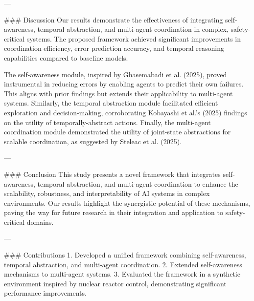 ---

### Discussion  
Our results demonstrate the effectiveness of integrating self-awareness, temporal abstraction, and multi-agent coordination in complex, safety-critical systems. The proposed framework achieved significant improvements in coordination efficiency, error prediction accuracy, and temporal reasoning capabilities compared to baseline models.  

The self-awareness module, inspired by Ghasemabadi et al. (2025), proved instrumental in reducing errors by enabling agents to predict their own failures. This aligns with prior findings but extends their applicability to multi-agent systems. Similarly, the temporal abstraction module facilitated efficient exploration and decision-making, corroborating Kobayashi et al.'s (2025) findings on the utility of temporally-abstract actions. Finally, the multi-agent coordination module demonstrated the utility of joint-state abstractions for scalable coordination, as suggested by Steleac et al. (2025).  

---

### Conclusion  
This study presents a novel framework that integrates self-awareness, temporal abstraction, and multi-agent coordination to enhance the scalability, robustness, and interpretability of AI systems in complex environments. Our results highlight the synergistic potential of these mechanisms, paving the way for future research in their integration and application to safety-critical domains.

---

### Contributions  
1. Developed a unified framework combining self-awareness, temporal abstraction, and multi-agent coordination.  
2. Extended self-awareness mechanisms to multi-agent systems.  
3. Evaluated the framework in a synthetic environment inspired by nuclear reactor control, demonstrating significant performance improvements.